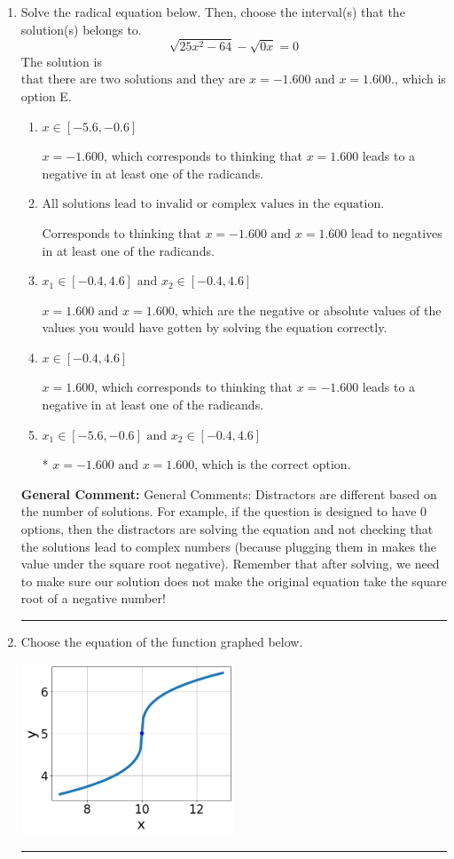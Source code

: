 \documentclass{extbook}[14pt]
\newcommand{\litem}[1]{\item #1

\rule{\textwidth}{0.4pt}}
\begin{document}
\begin{enumerate}\litem{
Solve the radical equation below. Then, choose the interval(s) that the solution(s) belongs to.
\[ \sqrt{25 x^2 - 64} - \sqrt{0 x} = 0 \]
The solution is \( \text{that there are two solutions and they are } x = -1.600 \text{ and } x = 1.600. \), which is option E.\begin{enumerate}[label=\Alph*.]
\item \( x \in [-5.6,-0.6] \)

$x = -1.600$, which corresponds to thinking that $x = 1.600$ leads to a negative in at least one of the radicands.
\item \( \text{All solutions lead to invalid or complex values in the equation.} \)

Corresponds to thinking that $x = -1.600 \text{ and } x = 1.600$ lead to negatives in at least one of the radicands.
\item \( x_1 \in [-0.4, 4.6] \text{ and } x_2 \in [-0.4,4.6] \)

$x = 1.600 \text{ and } x = 1.600$, which are the negative or absolute values of the values you would have gotten by solving the equation correctly.
\item \( x \in [-0.4,4.6] \)

$x = 1.600$, which corresponds to thinking that $x = -1.600$ leads to a negative in at least one of the radicands.
\item \( x_1 \in [-5.6, -0.6] \text{ and } x_2 \in [-0.4,4.6] \)

* $x = -1.600 \text{ and } x = 1.600$, which is the correct option.
\end{enumerate}

\textbf{General Comment:} General Comments: Distractors are different based on the number of solutions. For example, if the question is designed to have 0 options, then the distractors are solving the equation and not checking that the solutions lead to complex numbers (because plugging them in makes the value under the square root negative). Remember that after solving, we need to make sure our solution does not make the original equation take the square root of a negative number!
}
\litem{
Choose the equation of the function graphed below.

\begin{center}
    \includegraphics[width=0.5\textwidth]{../Figures/radicalGraphToEquationC.png}
\end{center}



}
\end{enumerate}
\end{document}
